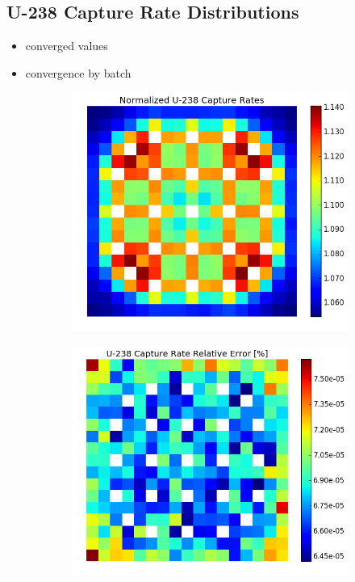 \subsection{U-238 Capture Rate Distributions}
\label{subsec:chap7-capture-rates}

\begin{itemize}[noitemsep]
  \item converged values
  \item convergence by batch
\end{itemize}

\begin{figure}[h!]
\centering
\begin{subfigure}{0.5\textwidth}
  \centering
  \includegraphics[width=\linewidth]{figures/benchmarks/capture-rates/capt-mean-fuel-16}
  \caption{}
  \label{fig:chap7-capt-rate-mean-1.6-assm}
\end{subfigure}%
\begin{subfigure}{0.5\textwidth}
  \centering
  \includegraphics[width=\linewidth]{figures/benchmarks/capture-rates/capt-rel-err-fuel-16}

\end{subfigure}
\end{figure}

